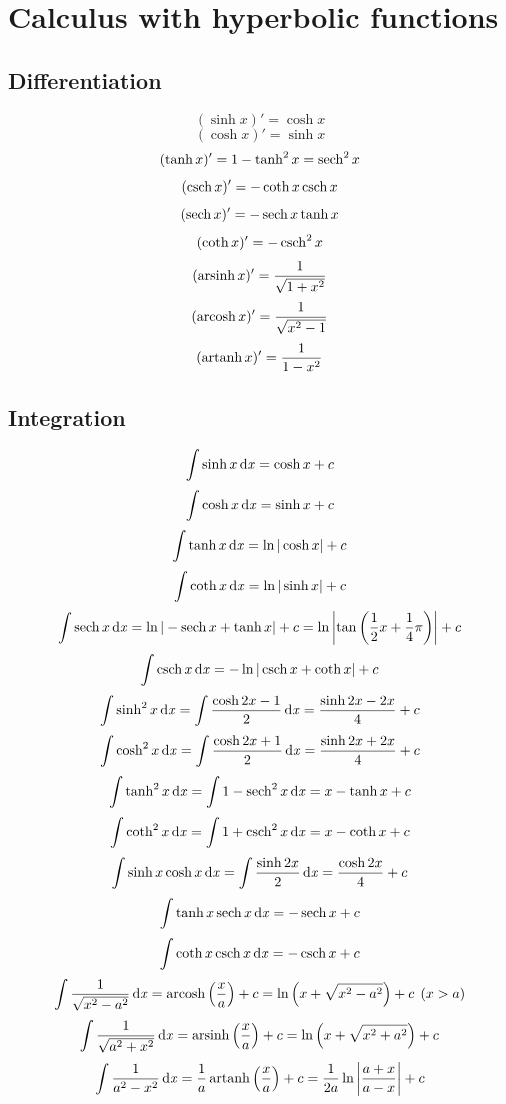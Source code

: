 \section{Calculus with hyperbolic functions}
\subsection{Differentiation}
\[(\sinh x)'=\cosh x\]
\[(\cosh x)'=\sinh x\]
\[(\tanh x)'=1-\tanh^2 x = \sech^2 x\]
\[(\csch x)'=-\coth x \csch x\]
\[(\sech x)'=-\sech x \tanh x\]
\[(\coth x)'=-\csch^2 x\]
\[(\arsinh x)' = \dfrac{1}{\sqrt{1+x^2}}\]
\[(\arcosh x)' = \dfrac{1}{\sqrt{x^2-1}}\]
\[(\artanh x)' = \dfrac{1}{1-x^2}\]


\subsection{Integration}
\[\int\sinh x \dx = \cosh x + c\]
\[\int\cosh x \dx = \sinh x + c\]
\[\int \tanh x \dx = \ln |\cosh x| + c\]
\[\int \coth x \dx = \ln |\sinh x| + c\]
\[\int \sech x \dx = \ln |-\sech x + \tanh x| + c = \ln \left|\tan\left(\frac{1}{2}x+\frac{1}{4}\pi \right)\right| + c\]
\[\int \csch x \dx = -\ln|\csch x + \coth x| + c\]
\[\int \sinh^2 x \dx = \int \frac{\cosh 2x - 1}{2} \dx = \frac{\sinh 2x - 2x}{4} + c\]
\[\int \cosh^2 x \dx = \int \frac{\cosh 2x + 1}{2} \dx = \frac{\sinh 2x + 2x}{4} + c\]
\[\int \tanh^2 x \dx = \int 1-\sech^2 x \dx = x - \tanh x + c\]
\[\int \coth^2 x \dx = \int 1+\csch^2 x \dx = x - \coth x + c\]
\[\int \sinh x \cosh x \dx = \int \frac{\sinh 2x}{2} \dx = \dfrac{\cosh 2x}{4} + c\]
\[\int \tanh x \sech x \dx = -\sech x + c\]
\[\int \coth x \csch x \dx = -\csch x + c\]
\[\int \frac{1}{\sqrt{x^2-a^2}} \dx= \arcosh \left(\frac{x}{a}\right) + c = \ln \left(x + \sqrt{x^2-a^2}\right) + c \:\:  (x>a)\]
\[\int \frac{1}{\sqrt{a^2+x^2}} \dx= \arsinh \left(\frac{x}{a}\right) + c = \ln \left(x + \sqrt{x^2+a^2}\right) + c \]
\[\int \frac{1}{a^2-x^2} \dx=\frac{1}{a}\artanh \left(\frac{x}{a}\right) + c = \frac{1}{2a}\ln \left|\frac{a+x}{a-x}\right| + c\]
